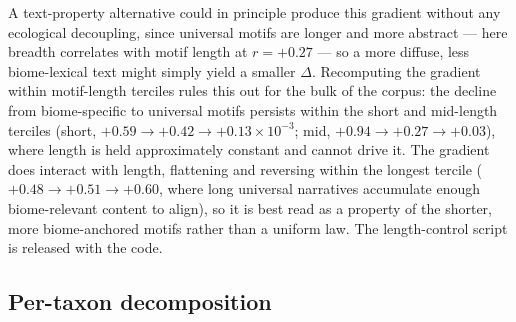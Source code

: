 \documentclass[11pt,a4paper]{article}
\begin{document}
A text-property alternative could in principle produce this
gradient without any ecological decoupling, since universal motifs
are longer and more abstract --- here breadth correlates with
motif length at $r=+0.27$ --- so a more diffuse, less
biome-lexical text might simply yield a smaller $\Delta$.
Recomputing the gradient within motif-length terciles rules this
out for the bulk of the corpus: the decline from biome-specific to
universal motifs persists within the short and mid-length terciles
(short, $+0.59 \to +0.42 \to +0.13\times 10^{-3}$; mid,
$+0.94 \to +0.27 \to +0.03$), where length is held approximately
constant and cannot drive it. The gradient does interact with
length, flattening and reversing within the longest tercile
($+0.48 \to +0.51 \to +0.60$, where long universal narratives
accumulate enough biome-relevant content to align), so it is best
read as a property of the shorter, more biome-anchored motifs
rather than a uniform law. The length-control script is released
with the code.

\subsection*{Per-taxon decomposition}
\end{document}
